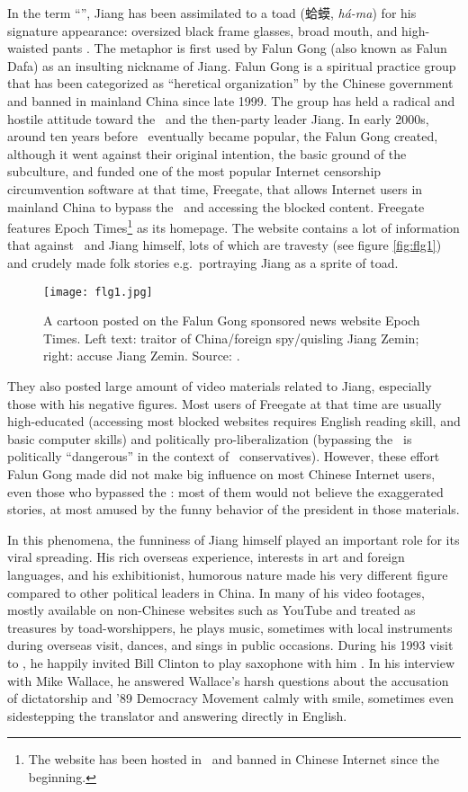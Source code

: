 In the term ``\moha'', Jiang has been assimilated to a toad (蛤蟆, \textit{h\'a-ma}) for his signature appearance: oversized black frame glasses, broad mouth, and high-waisted pants \citep{_jiang_2016}. The metaphor is first used by Falun Gong (also known as Falun Dafa) as an insulting nickname of Jiang. Falun Gong is a spiritual practice group that has been categorized as ``heretical organization'' by the Chinese government and banned in mainland China since late 1999. The group has held a radical and hostile attitude toward the \cpc\ and the then-party leader Jiang. In early 2000s, around ten years before \moha\ eventually became popular, the Falun Gong created, although it went against their original intention, the basic ground of the subculture, and funded one of the most popular Internet censorship circumvention software at that time, Freegate, that allows Internet users in mainland China to bypass the \gfw\ and accessing the blocked content. Freegate features Epoch Times\footnote[][-.7cm]{The website has been hosted in \usa\ and banned in Chinese Internet since the beginning.} as its homepage. The website contains a lot of information that against \cpc\ and Jiang himself, lots of which are travesty (see figure \vref{fig:flg1}) and crudely made folk stories e.g.\ portraying Jiang as a sprite of toad.
\begin{figure}[!htbp]
	\centering
	\texttt{[image: flg1.jpg]}
	\caption[A cartoon posted on the Falun Gong sponsored news website Epoch Times]{A cartoon posted on the Falun Gong sponsored news website Epoch Times. Left text: traitor of China/foreign spy/quisling Jiang Zemin; right: accuse Jiang Zemin. Source: \citet{__????-162}.}
	\label{fig:flg1}
\end{figure}
They also posted large amount of video materials related to Jiang, especially those with his negative figures. Most users of Freegate at that time are usually high-educated (accessing most blocked websites requires English reading skill, and basic computer skills) and politically pro-liberalization (bypassing the \gfw\ is politically ``dangerous'' in the context of \cpc\ conservatives). However, these effort Falun Gong made did not make big influence on most Chinese Internet users, even those who bypassed the \gfw: most of them would not believe the exaggerated stories, at most amused by the funny behavior of the president in those materials.

In this phenomena, the funniness of Jiang himself played an important role for its viral spreading. His rich overseas experience, interests in art and foreign languages, and his exhibitionist, humorous nature made his very different figure compared to other political leaders in China. In many of his video footages, mostly available on non-Chinese websites such as YouTube and treated as treasures by toad-worshippers, he plays music, sometimes with local instruments during overseas visit, dances, and sings in public occasions. During his 1993 visit to \usa, he happily invited Bill Clinton to play saxophone with him \citep{kuhn_man_2005}. In his interview with Mike Wallace, he answered Wallace's harsh questions about the accusation of dictatorship and '89 Democracy Movement calmly with smile, sometimes even sidestepping the translator and answering directly in English.

